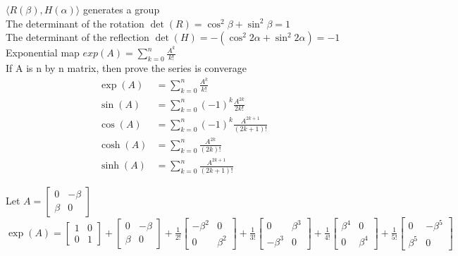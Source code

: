 \documentclass{article}
\begin{document}
$\langle R(\beta) , H(\alpha) \rangle $ generates a group\\

\noindent 
The determinant of the rotation $\det(R) = \cos^{2}\beta + \sin^{2}\beta = 1$\\
The determinant of the reflection $\det(H) = -(\cos^{2}2\alpha+ \sin^{2}2\alpha)= -1$\\

\noindent Exponential map
$exp(A) = \sum_{k=0}^{n} \frac{A^{k}}{k!}$\\
If A is n by n matrix, then prove the series is converage\\

\begin{equation}
\begin{aligned}
    \exp(A)  & = \sum_{k=0}^{n} \frac{A^{k}}{k!} \\
    \sin(A)  & = \sum_{k=0}^{n} (-1)^{k}\frac{A^{2k}}{2k!} \\
    \cos(A)  & = \sum_{k=0}^{n} (-1)^{k}\frac{A^{2k+1}}{(2k+1)!} \\
    \cosh(A) & = \sum_{k=0}^{n} \frac{A^{2k}}{(2k)!} \\
    \sinh(A) & = \sum_{k=0}^{n} \frac{A^{2k+1}}{(2k+1)!}  \nonumber
\end{aligned}
\end{equation}

\noindent
Let $ A = 
    \begin{bmatrix}
    0 & -\beta \\
    \beta & 0 
    \end{bmatrix}
$\\
$
    \exp(A) = 
        \begin{bmatrix}
        1 & 0 \\
        0 & 1 
        \end{bmatrix}
        +
        \begin{bmatrix}
        0 & -\beta \\
        \beta & 0 
        \end{bmatrix}
        +
        \frac{1}{2!}
        \begin{bmatrix}
        -\beta^{2} & 0 \\
        0 & \beta^{2} 
        \end{bmatrix}
        +
        \frac{1}{3!}
        \begin{bmatrix}
        0 & \beta^{3} \\
        -\beta^{3} & 0 
        \end{bmatrix}
        +
        \frac{1}{4!}
        \begin{bmatrix}
        \beta^{4} & 0 \\
         0 & \beta^{4} 
        \end{bmatrix}
        +
        \frac{1}{5!}
        \begin{bmatrix}
        0 & -\beta^{5}\\
        \beta^{5} & 0 
        \end{bmatrix}
$\\
\end{document}
